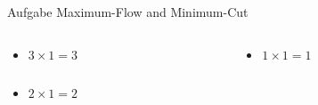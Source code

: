 \begin{frame}[allowframebreaks]{Aufgabe \thesection}{Maximum-Flow and Minimum-Cut}
\begin{solutionnoinc}
\begin{columns}
\begin{column}{0.5\textwidth}
\begin{itemize}
        \end{itemize}
      \end{column}
    \end{columns}
  \end{solutionnoinc}
  \begin{solutionnoinc}
    \begin{columns}
      \begin{column}{0.5\textwidth}
        \begin{itemize}
          \item $3\times 1 = 3$
        \end{itemize}
      \end{column}
      \begin{column}{0.5\textwidth}
        \begin{itemize}
          \item $1\times 1 = 1$
        \end{itemize}
      \end{column}
    \end{columns}
  \end{solutionnoinc}
  \begin{solutionnoinc}
    \begin{columns}
      \begin{column}{0.5\textwidth}
        \begin{itemize}
          \item $2\times 1 = 2$
        \end{itemize}
      \end{column}
      \begin{column}{0.5\textwidth}
        \begin{itemize}

\end{itemize}
\end{column}
\end{columns}
\end{solutionnoinc}
\end{frame}
